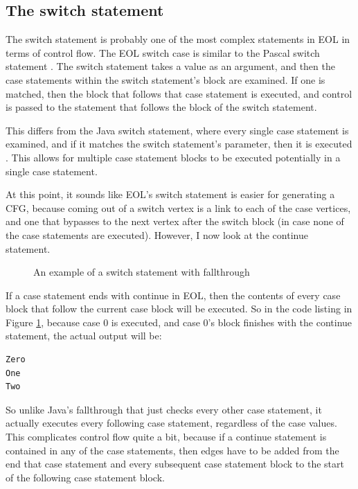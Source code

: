\subsection{The switch statement}

The switch statement is probably one of the most complex statements in EOL in terms of control flow. The EOL switch case is similar to the Pascal switch statement \citep{pascalSwitch}. The switch statement takes a value as an argument, and then the case statements within the switch statement's block are examined. If one is matched, then the block that follows that case statement is executed, and control is passed to the statement that follows the block of the switch statement.

This differs from the Java switch statement, where every single case statement is examined, and if it matches the switch statement's parameter, then it is executed \citep{pascalSwitch}. This allows for multiple case statement blocks to be executed potentially in a single case statement.

At this point, it sounds like EOL's switch statement is easier for generating a CFG, because coming out of a switch vertex is a link to each of the case vertices, and one that bypasses to the next vertex after the switch block (in case none of the case statements are executed). However, I now look at the continue statement.

\begin{figure}[h]

\caption{An example of a switch statement with fallthrough}
\label{lst:switchFallthrough}
\end{figure}

If a case statement ends with continue in EOL, then the contents of every case block that follow the current case block will be executed. So in the code listing in Figure \ref{lst:switchFallthrough}, because case 0 is executed, and case 0's block finishes with the continue statement, the actual output will be:

\begin{verbatim}
Zero
One
Two
\end{verbatim}

So unlike Java's fallthrough that just checks every other case statement, it actually executes every following case statement, regardless of the case values. This complicates control flow quite a bit, because if a continue statement is contained in any of the case statements, then edges have to be added from the end that case statement and every subsequent case statement block to the start of the following case statement block.

